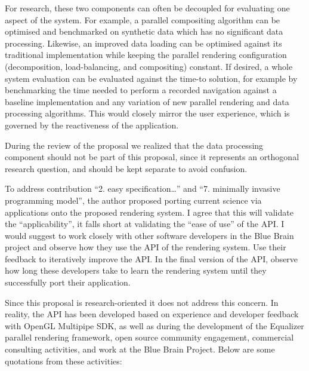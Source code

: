 For research, these two components can often be decoupled for evaluating one
aspect of the system. For example, a parallel compositing algorithm can be
optimised and benchmarked on synthetic data which has no significant data
processing. Likewise, an improved data loading can be optimised against its
traditional implementation while keeping the parallel rendering configuration
(decomposition, load-balancing, and compositing) constant. If desired, a whole
system evaluation can be evaluated against the time-to solution, for example by
benchmarking the time needed to perform a recorded navigation against a baseline
implementation and any variation of new parallel rendering and data processing
algorithms. This would closely mirror the user experience, which is governed by
the reactiveness of the application.

During the review of the proposal we realized that the data processing component
should not be part of this proposal, since it represents an orthogonal research
question, and should be kept separate to avoid confusion.

\begin{displayquote} To address contribution “2. easy specification…” and “7.
minimally invasive programming model”, the author proposed porting current
science via applications onto the proposed rendering system. I agree that this
will validate the “applicability”, it falls short at validating the “ease of
use” of the API. I would suggest to work closely with other software developers
in the Blue Brain project and observe how they use the API of the rendering
system. Use their feedback to iteratively improve the API. In the final version
of the API, observe how long these developers take to learn the rendering system
until they successfully port their application.
\end{displayquote}

Since this proposal is research-oriented it does not address this concern. In
reality, the API has been developed based on experience and developer feedback
with OpenGL Multipipe SDK, as well as during the development of the Equalizer
parallel rendering framework, open source community engagement, commercial
consulting activities, and work at the Blue Brain Project. Below are some
quotations from these activities:

